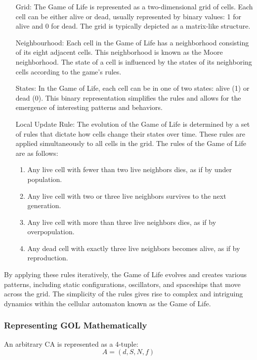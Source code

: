 \begin{enumerate}[align=left]
	\item[Grid:] The Game of Life is represented as a two-dimensional grid of cells. Each cell can be either alive or dead, usually represented by binary values: 1 for alive and 0 for dead. The grid is typically depicted as a matrix-like structure.
	\item[Neighbourhood:] Each cell in the Game of Life has a neighborhood consisting of its eight adjacent cells. This neighborhood is known as the Moore neighborhood. The state of a cell is influenced by the states of its neighboring cells according to the game's rules.
	\item[States:] In the Game of Life, each cell can be in one of two states: alive (1) or dead (0). This binary representation simplifies the rules and allows for the emergence of interesting patterns and behaviors.
	\item[Local Update Rule:] The evolution of the Game of Life is determined by a set of rules that dictate how cells change their states over time. These rules are applied simultaneously to all cells in the grid. The rules of the Game of Life are as follows:
	\begin{enumerate}
		\item Any live cell with fewer than two live neighbors dies, as if by under population.
		\item Any live cell with two or three live neighbors survives to the next generation.
		\item Any live cell with more than three live neighbors dies, as if by overpopulation.
		\item Any dead cell with exactly three live neighbors becomes alive, as if by reproduction.
	\end{enumerate}
\end{enumerate}

By applying these rules iteratively, the Game of Life evolves and creates various patterns, including static configurations, oscillators, and spaceships that move across the grid. The simplicity of the rules gives rise to complex and intriguing dynamics within the cellular automaton known as the Game of Life.

\subsubsection*{Representing GOL Mathematically}

 An arbitrary CA is represented as a 4-tuple:
\begin{equation}
	A = (d, S, N, f)
\end{equation}

